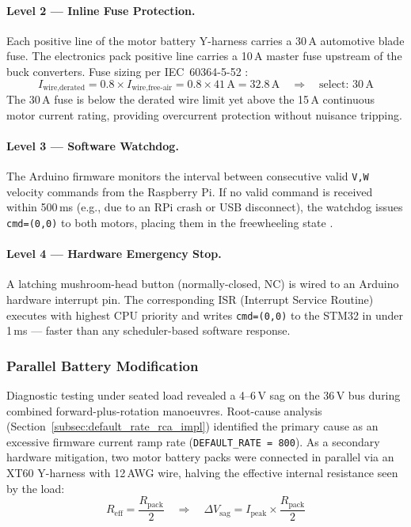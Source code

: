 \documentclass[12pt,a4paper]{report}
\begin{document}
\paragraph{Level 2 — Inline Fuse Protection.}
Each positive line of the motor battery Y-harness carries a 30\,A automotive
blade fuse. The electronics pack positive line carries a 10\,A master fuse
upstream of the buck converters. Fuse sizing per IEC~60364-5-52
\cite{iec60364}:
\begin{equation}
  I_\text{wire,derated} = 0.8 \times I_\text{wire,free-air}
  = 0.8 \times 41\,\text{A} = 32.8\,\text{A}
  \quad\Rightarrow\quad
  \text{select: } \boxed{30\,\text{A}}
  \label{eq:fuse_sizing_impl}
\end{equation}
The 30\,A fuse is below the derated wire limit yet above the 15\,A continuous
motor current rating, providing overcurrent protection without nuisance tripping.

\paragraph{Level 3 — Software Watchdog.}
The Arduino firmware monitors the interval between consecutive valid
\texttt{V,W} velocity commands from the Raspberry Pi. If no valid command
is received within 500\,ms (e.g., due to an RPi crash or USB disconnect),
the watchdog issues \texttt{cmd=(0,0)} to both motors, placing them in the
freewheeling state \cite{ganssle2008firmware}.

\paragraph{Level 4 — Hardware Emergency Stop.}
A latching mushroom-head button (normally-closed, NC) is wired to an Arduino
hardware interrupt pin. The corresponding ISR (Interrupt Service Routine)
executes with highest CPU priority and writes \texttt{cmd=(0,0)} to the STM32
in under 1\,ms — faster than any scheduler-based software response.

\subsubsection{Parallel Battery Modification}
\label{subsec:parallel_battery_impl}

Diagnostic testing under seated load revealed a 4–6\,V sag on the 36\,V bus
during combined forward-plus-rotation manoeuvres. Root-cause analysis
(Section~\ref{subsec:default_rate_rca_impl}) identified the primary cause as an
excessive firmware current ramp rate (\texttt{DEFAULT\_RATE = 800}).
As a secondary hardware mitigation, two motor battery packs were connected in
parallel via an XT60 Y-harness with 12\,AWG wire, halving the effective internal
resistance seen by the load:
\begin{equation}
  R_\text{eff} = \frac{R_\text{pack}}{2}
  \quad\Longrightarrow\quad
  \Delta V_\text{sag} = I_\text{peak} \times \frac{R_\text{pack}}{2}
  \label{eq:parallel_resistance_impl}
\end{equation}
\end{document}

